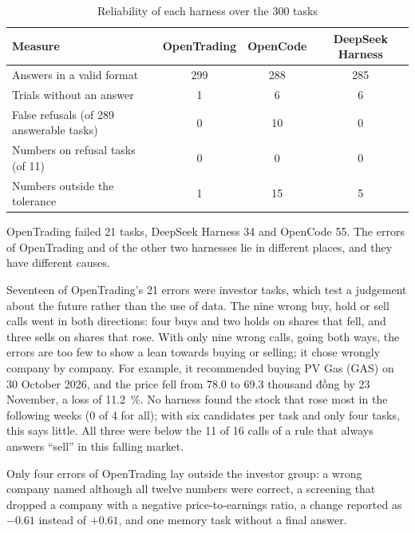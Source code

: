\begin{table}[H]
  \centering
  \caption{Reliability of each harness over the 300 tasks}\label{tab:reliability}
  \begin{tabularx}{\textwidth}{@{}L *{3}{S[table-format=3.0]}@{}}
    \toprule
    {Measure} & {OpenTrading} & {OpenCode} & {DeepSeek Harness}\\
    \midrule
    Answers in a valid format & 299 & 288 & 285\\
    Trials without an answer & 1 & 6 & 6\\
    False refusals (of 289 answerable tasks) & 0 & 10 & 0\\
    Numbers on refusal tasks (of 11) & 0 & 0 & 0\\
    Numbers outside the tolerance & 1 & 15 & 5\\
    \bottomrule
  \end{tabularx}
\end{table}

\label{sec:error-analysis}
OpenTrading failed 21 tasks, DeepSeek Harness 34 and OpenCode 55.
The errors of OpenTrading and of the other two harnesses lie in different places, and they have different causes.

Seventeen of OpenTrading's 21 errors were investor tasks, which test a judgement about the future rather than the use of data.
The nine wrong buy, hold or sell calls went in both directions: four buys and two holds on shares that fell, and three sells on shares that rose.
With only nine wrong calls, going both ways, the errors are too few to show a lean towards buying or selling; it chose wrongly company by company.
For example, it recommended buying PV Gas (GAS) on 30 October 2026, and the price fell from \num{78.0} to \num{69.3} thousand đồng by 23 November, a loss of \qty{11.2}{\percent}.
No harness found the stock that rose most in the following weeks (0 of 4 for all); with six candidates per task and only four tasks, this says little.
All three were below the 11 of 16 calls of a rule that always answers \enquote{sell} in this falling market.

Only four errors of OpenTrading lay outside the investor group: a wrong company named although all twelve numbers were correct, a screening that dropped a company with a negative price-to-earnings ratio, a change reported as $-0.61$ instead of $+0.61$, and one memory task without a final answer.

